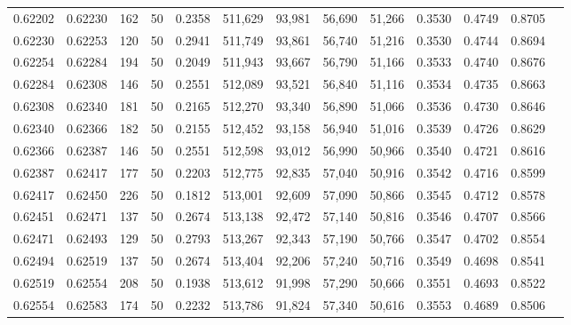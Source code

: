 \begin{tabular}{rrrrrrrrrrrrr}
0.62202 & 0.62230 &   162 &  50 &                                     0.2358 & 511,629 &  93,981 &  56,690 &  51,266 & 0.3530 & 0.4749 & 0.8705 \\
0.62230 & 0.62253 &   120 &  50 &                                     0.2941 & 511,749 &  93,861 &  56,740 &  51,216 & 0.3530 & 0.4744 & 0.8694 \\
0.62254 & 0.62284 &   194 &  50 &                                     0.2049 & 511,943 &  93,667 &  56,790 &  51,166 & 0.3533 & 0.4740 & 0.8676 \\
0.62284 & 0.62308 &   146 &  50 &                                     0.2551 & 512,089 &  93,521 &  56,840 &  51,116 & 0.3534 & 0.4735 & 0.8663 \\
0.62308 & 0.62340 &   181 &  50 &                                     0.2165 & 512,270 &  93,340 &  56,890 &  51,066 & 0.3536 & 0.4730 & 0.8646 \\
0.62340 & 0.62366 &   182 &  50 &                                     0.2155 & 512,452 &  93,158 &  56,940 &  51,016 & 0.3539 & 0.4726 & 0.8629 \\
0.62366 & 0.62387 &   146 &  50 &                                     0.2551 & 512,598 &  93,012 &  56,990 &  50,966 & 0.3540 & 0.4721 & 0.8616 \\
0.62387 & 0.62417 &   177 &  50 &                                     0.2203 & 512,775 &  92,835 &  57,040 &  50,916 & 0.3542 & 0.4716 & 0.8599 \\
0.62417 & 0.62450 &   226 &  50 &                                     0.1812 & 513,001 &  92,609 &  57,090 &  50,866 & 0.3545 & 0.4712 & 0.8578 \\
0.62451 & 0.62471 &   137 &  50 &                                     0.2674 & 513,138 &  92,472 &  57,140 &  50,816 & 0.3546 & 0.4707 & 0.8566 \\
0.62471 & 0.62493 &   129 &  50 &                                     0.2793 & 513,267 &  92,343 &  57,190 &  50,766 & 0.3547 & 0.4702 & 0.8554 \\
0.62494 & 0.62519 &   137 &  50 &                                     0.2674 & 513,404 &  92,206 &  57,240 &  50,716 & 0.3549 & 0.4698 & 0.8541 \\
0.62519 & 0.62554 &   208 &  50 &                                     0.1938 & 513,612 &  91,998 &  57,290 &  50,666 & 0.3551 & 0.4693 & 0.8522 \\
0.62554 & 0.62583 &   174 &  50 &                                     0.2232 & 513,786 &  91,824 &  57,340 &  50,616 & 0.3553 & 0.4689 & 0.8506 \\

\end{tabular}
